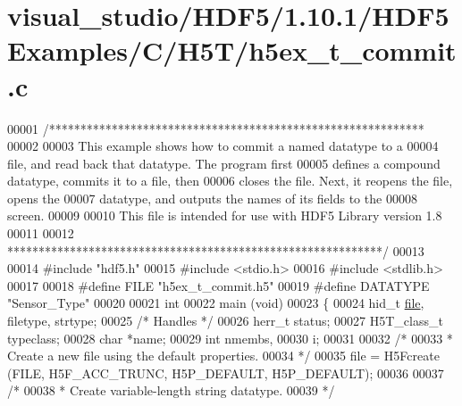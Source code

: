 \hypertarget{visual__studio_2_h_d_f5_21_810_81_2_h_d_f5_examples_2_c_2_h5_t_2h5ex__t__commit_8c_source}{}\section{visual\+\_\+studio/\+H\+D\+F5/1.10.1/\+H\+D\+F5\+Examples/\+C/\+H5\+T/h5ex\+\_\+t\+\_\+commit.c}
\label{visual__studio_2_h_d_f5_21_810_81_2_h_d_f5_examples_2_c_2_h5_t_2h5ex__t__commit_8c_source}

\begin{DoxyCode}
00001 \textcolor{comment}{/************************************************************}
00002 \textcolor{comment}{}
00003 \textcolor{comment}{  This example shows how to commit a named datatype to a}
00004 \textcolor{comment}{  file, and read back that datatype.  The program first}
00005 \textcolor{comment}{  defines a compound datatype, commits it to a file, then}
00006 \textcolor{comment}{  closes the file.  Next, it reopens the file, opens the}
00007 \textcolor{comment}{  datatype, and outputs the names of its fields to the}
00008 \textcolor{comment}{  screen.}
00009 \textcolor{comment}{}
00010 \textcolor{comment}{  This file is intended for use with HDF5 Library version 1.8}
00011 \textcolor{comment}{}
00012 \textcolor{comment}{ ************************************************************/}
00013 
00014 \textcolor{preprocessor}{#include "hdf5.h"}
00015 \textcolor{preprocessor}{#include <stdio.h>}
00016 \textcolor{preprocessor}{#include <stdlib.h>}
00017 
00018 \textcolor{preprocessor}{#define FILE            "h5ex\_t\_commit.h5"}
00019 \textcolor{preprocessor}{#define DATATYPE        "Sensor\_Type"}
00020 
00021 \textcolor{keywordtype}{int}
00022 main (\textcolor{keywordtype}{void})
00023 \{
00024     hid\_t           \hyperlink{structfile}{file}, filetype, strtype;
00025                                             \textcolor{comment}{/* Handles */}
00026     herr\_t          status;
00027     H5T\_class\_t     typeclass;
00028     \textcolor{keywordtype}{char}            *name;
00029     \textcolor{keywordtype}{int}             nmembs,
00030                     i;
00031 
00032     \textcolor{comment}{/*}
00033 \textcolor{comment}{     * Create a new file using the default properties.}
00034 \textcolor{comment}{     */}
00035     file = H5Fcreate (FILE, H5F\_ACC\_TRUNC, H5P\_DEFAULT, H5P\_DEFAULT);
00036 
00037     \textcolor{comment}{/*}
00038 \textcolor{comment}{     * Create variable-length string datatype.}
00039 \textcolor{comment}{     */}

\end{DoxyCode}
